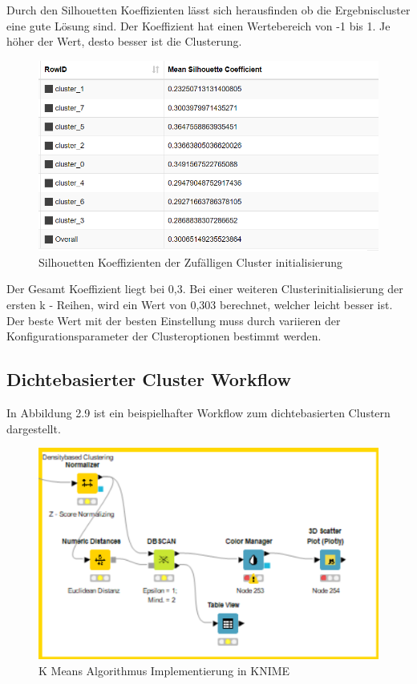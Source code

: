 \documentclass[12pt,					%
							 oneside,			%
							 a4paper,			%
							 halfparskip,		%
							 liststotoc,			%
							 bibtotoc,			%
							 fleqn,				%
							 pointlessnumbers]	%
							 {scrreprt}
\begin{document}
		Durch den Silhouetten Koeffizienten lässt sich herausfinden ob die Ergebniscluster eine gute Lösung sind. Der Koeffizient hat einen Wertebereich von -1 bis 1. Je höher der Wert, desto besser ist die Clusterung.
		\newpage
		\begin{figure}[!h]
			\begin{center}
				\includegraphics[scale=0.5]{pictures/sil_mean.png}
				\caption{Silhouetten Koeffizienten der Zufälligen Cluster initialisierung}
			\end{center}
		\end{figure}
		
		Der Gesamt Koeffizient liegt bei 0,3. Bei einer weiteren Clusterinitialisierung der ersten k - Reihen, wird ein Wert von 0,303 berechnet, welcher leicht besser ist. Der beste Wert mit der besten Einstellung muss durch variieren der Konfigurationsparameter der Clusteroptionen bestimmt werden. 
		\subsection{Dichtebasierter Cluster Workflow}
		In Abbildung 2.9 ist ein beispielhafter Workflow zum dichtebasierten Clustern dargestellt.
		
		\begin{figure}[!h]
			\begin{center}
				\includegraphics[scale=1]{pictures/dichte.png}
				\caption{K Means Algorithmus Implementierung in KNIME}
			\end{center}
		\end{figure}
		
\end{document}
